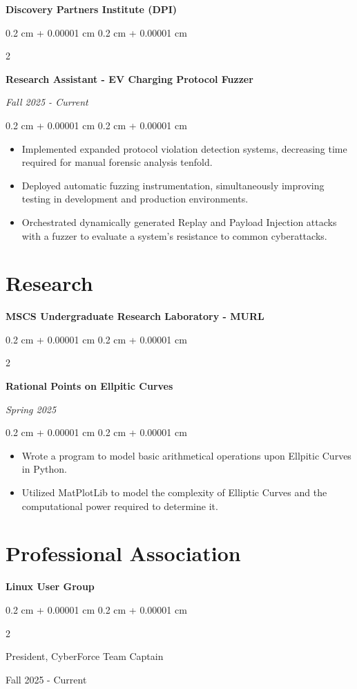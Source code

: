 \documentclass[10pt, letterpaper]{article}
\newenvironment{highlights}{
    \begin{itemize}[
        topsep=0.10 cm,
        parsep=0.10 cm,
        partopsep=0pt,
        itemsep=0pt,
        leftmargin=0.4 cm + 10pt
    ]
}{
    \end{itemize}
} %
\newenvironment{onecolentry}{
    \begin{adjustwidth}{
        0.2 cm + 0.00001 cm
    }{
        0.2 cm + 0.00001 cm
    }
}{
    \end{adjustwidth}
} %
\newenvironment{twocolentry}[2][]{
    \onecolentry
    \def\secondColumn{#2}
    \setcolumnwidth{\fill, 4.5 cm}
    \begin{paracol}{2}
}{
    \switchcolumn \raggedleft \secondColumn
    \end{paracol}
    \endonecolentry
} %
\begin{document}
\textbf{Discovery Partners Institute (DPI)}
\begin{twocolentry}{
    \textit{Fall 2025 - Current}
    }
    \textbf{Research Assistant - EV Charging Protocol Fuzzer}
\end{twocolentry}
\begin{onecolentry}
    \begin{highlights}
      \item Implemented expanded protocol violation detection systems, decreasing time required for manual forensic analysis tenfold. 
      \item Deployed automatic fuzzing instrumentation, simultaneously improving testing in development and production environments.
      \item Orchestrated dynamically generated Replay and Payload Injection attacks with a fuzzer to evaluate a system's resistance to common cyberattacks. 
    \end{highlights}
\end{onecolentry}


\section{Research}

\textbf{MSCS Undergraduate Research Laboratory - MURL}

\begin{twocolentry}{
    \textit{Spring 2025}
    }
    \textbf{Rational Points on Ellpitic Curves}
\end{twocolentry}
\begin{onecolentry}
    \begin{highlights}
      \item Wrote a program to model basic arithmetical operations upon Ellpitic Curves in Python.
      \item Utilized MatPlotLib to model the complexity of Elliptic Curves and the computational power required to determine it.
    \end{highlights}
\end{onecolentry}


\section{Professional Association}
\textbf{Linux User Group}

\begin{twocolentry}{
    Fall 2025 - Current
    }

  President, CyberForce Team Captain
\end{twocolentry}
\end{document}
